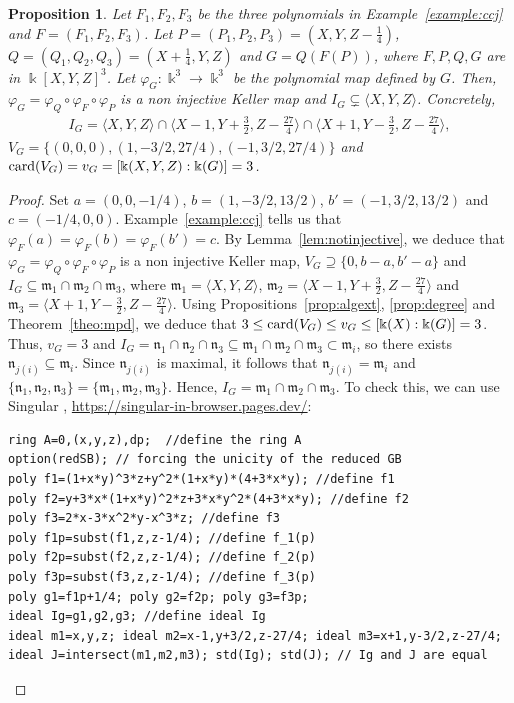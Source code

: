 \documentclass[11pt,reqno]{amsart}
\newtheorem{proposition}[theorem]{Proposition}
\theoremstyle{definition}
\newcommand{\mbk}{\mbox{$\Bbbk$}}
\newcommand{\mfm}{\mbox{$\mathfrak{m}$}}
\newcommand{\mfn}{\mbox{$\mathfrak{n}$}}
\newcommand{\card}{\mbox{${\rm card}$}}
\begin{document}
\begin{proposition}\label{prop:IF<xyz} 
Let $F_1,F_2,F_3$ be the three polynomials in {\rm Example~\ref{example:ccj}} and
$F=(F_1,F_2,F_3)$. Let $P=(P_1,P_2,P_3)=(X,Y,Z-\tfrac{1}{4})$, 
$Q=(Q_1,Q_2,Q_3)=(X+\tfrac{1}{4},Y,Z)$ and $G=Q(F(P))$, where
$F,P,Q,G$ are in $\mbk[X,Y,Z]^3$.
Let $\varphi_G:\mbk^3\to \mbk^3$ be the polynomial map defined by $G$. 
Then, $\varphi_G=\varphi_Q\circ\varphi_F\circ\varphi_P$ is a non injective Keller map 
and $I_G\subsetneq \langle X,Y,Z\rangle$. Concretely, 
\begin{eqnarray*}
I_G=\langle X,Y,Z\rangle\cap\langle X-1,Y+\tfrac{3}{2},Z-\tfrac{27}{4}\rangle
\cap\langle X+1,Y-\tfrac{3}{2},Z-\tfrac{27}{4}\rangle,
\end{eqnarray*}
$V_G=\{(0,0,0),(1,-3/2,27/4),(-1,3/2,27/4)\}$ and
$\card(V_G)=v_G=[\mbk(X,Y,Z):\mbk(G)]=3$.
\end{proposition}
\begin{proof} 
Set $a=(0,0,-1/4)$, $b=(1,-3/2,13/2)$, $b'=(-1,3/2,13/2)$ and $c=(-1/4,0,0)$.
Example~\ref{example:ccj} tells us that $\varphi_F(a)=\varphi_F(b)=\varphi_F(b')=c$.
By Lemma~\ref{lem:notinjective}, we deduce that 
$\varphi_G=\varphi_Q\circ\varphi_F\circ\varphi_P$ is a non injective Keller map, 
$V_G\supseteq \{0,b-a,b'-a\}$ and $I_G\subseteq\mfm_1\cap\mfm_2\cap \mfm_3$, where 
$\mfm_1=\langle X,Y,Z\rangle$, $\mfm_2=\langle X-1,Y+\tfrac{3}{2},Z-\tfrac{27}{4}\rangle$
and $\mfm_3=\langle X+1,Y-\tfrac{3}{2},Z-\tfrac{27}{4}\rangle$.
Using Propositions~\ref{prop:algext}, \ref{prop:degree} and Theorem~\ref{theo:mpd}, we deduce that
$3\leq \card(V_G)\leq v_G\leq [\mbk(X):\mbk(G)]=3$. Thus, $v_G=3$ and $I_G=\mfn_1\cap\mfn_2\cap\mfn_3\subseteq \mfm_1\cap\mfm_2\cap\mfm_3\subset \mfm_i$, so
there exists $\mfn_{j(i)}\subseteq \mfm_i$. Since $\mfn_{j(i)}$ is maximal, it follows that
$\mfn_{j(i)}=\mfm_i$ and $\{\mfn_1,\mfn_2,\mfn_3\}=\{\mfm_1,\mfm_2,\mfm_3\}$. Hence, $I_G=\mfm_1\cap\mfm_2\cap \mfm_3$.
To check this, we can use {\sc Singular} \cite{dgps}, \url{https://singular-in-browser.pages.dev/}:
\begin{verbatim}
ring A=0,(x,y,z),dp;  //define the ring A
option(redSB); // forcing the unicity of the reduced GB
poly f1=(1+x*y)^3*z+y^2*(1+x*y)*(4+3*x*y); //define f1 
poly f2=y+3*x*(1+x*y)^2*z+3*x*y^2*(4+3*x*y); //define f2
poly f3=2*x-3*x^2*y-x^3*z; //define f3
poly f1p=subst(f1,z,z-1/4); //define f_1(p)
poly f2p=subst(f2,z,z-1/4); //define f_2(p)
poly f3p=subst(f3,z,z-1/4); //define f_3(p)
poly g1=f1p+1/4; poly g2=f2p; poly g3=f3p; 
ideal Ig=g1,g2,g3; //define ideal Ig
ideal m1=x,y,z; ideal m2=x-1,y+3/2,z-27/4; ideal m3=x+1,y-3/2,z-27/4;
ideal J=intersect(m1,m2,m3); std(Ig); std(J); // Ig and J are equal
\end{verbatim}
\end{proof}
\end{document}
